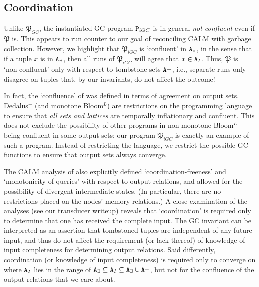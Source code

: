 \documentclass{article}
\numberwithin{equation}{section}
\renewcommand{\tt}[1]{\ifmmode\text{\texttt{#1}}\else\texttt{#1}\fi}
\begin{document}
\subsection{Coordination}
Unlike $\mathfrak{P}_{GC}$, the instantiated GC program $\tt{P}_{iGC}$ is in general \emph{not confluent} even if $\mathfrak{P}$ is.
This appears to run counter to our goal of reconciling CALM with garbage collection.
However, we highlight that $\mathfrak{P}_{iGC}$ is `confluent' in $\tt{A}_\exists$, in the sense that if a tuple $x$ is in $\tt{A}_\exists$, then all runs of $\mathfrak{P}_{iGC}$ will agree that $x \in \tt{A}_I$.
Thus, $\mathfrak{P}$ is `non-confluent' only with respect to tombstone sets $\tt{A}_\top$, i.e., separate runs only disagree on tuples that, by our invariants, do not affect the outcome!

In fact, the `confluence' of \cite{marczak2012confluence} was defined in terms of agreement on output sets.
Dedalus$^+$ (and monotone Bloom$^L$) are restrictions on the programming language to ensure that \emph{all sets and lattices} are temporally inflationary and confluent.
This does not exclude the possibility of other programs in non-monotone Bloom$^L$ being confluent in some output sets;
our program $\mathfrak{P}_{iGC}$ is exactly an example of such a program.
Instead of restricting the language, we restrict the possible GC functions to ensure that output sets always converge.

The CALM analysis of \cite{ameloot2014weaker} also explicitly defined `coordination-freeness' and `monotonicity of queries' with respect to output relations, and allowed for the possibility of divergent intermediate states.
(In particular, there are no restrictions placed on the nodes' memory relations.)
A close examination of the analyses (see our transducer writeup) reveals that `coordination' is required only to determine that one has received the complete input.
The GC invariant can be interpreted as an assertion that tombstoned tuples are independent of any future input, and thus do not affect the requirement (or lack thereof) of knowledge of input completeness for determining output relations.
Said differently, coordination (or knowledge of input completeness) is required only to converge on where $\tt{A}_I$ lies in the range of $\tt{A}_\exists \subseteq \tt{A}_I \subseteq \tt{A}_\exists \cup \tt{A}_\top$, but not for the confluence of the output relations that we care about.
\end{document}
